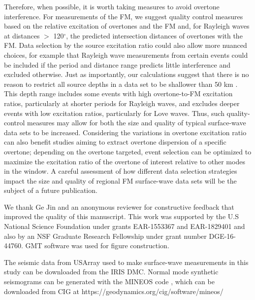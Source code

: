 \documentclass[extra,mreferee]{gji}
\begin{document}
Therefore, when possible, it is worth taking measures to avoid overtone interference. For measurements of the FM, we suggest quality control measures based on the relative excitation of overtones and the FM and, for Rayleigh waves at distances $>$ 120$^\circ$, the predicted intersection distances of overtones with the FM. Data selection by the source excitation ratio could also allow more nuanced choices, for example that Rayleigh wave measurements from certain events could be included if the period and distance range predicts little interference and excluded otherwise. Just as importantly, our calculations suggest that there is no reason to restrict all source depths in a data set to be shallower than 50 km  \citep[e.g.][]{jin2015crust,accardo2017surface,adams2018relationships,babikoff2019long}. This depth range includes some events with high overtone-to-FM excitation ratios, particularly at shorter periods for Rayleigh waves, and excludes deeper events with low excitation ratios, particularly for Love waves. Thus, such quality-control measures may allow for both the size and quality of typical surface-wave data sets to be increased. Considering the variations in overtone excitation ratio can also benefit studies aiming to extract overtone dispersion of a specific overtone; depending on the overtone targeted, event selection can be optimized to maximize the excitation ratio of the overtone of interest relative to other modes in the window.  A careful assessment of how different data selection strategies impact the size and quality of regional FM surface-wave data sets will be the subject of a future publication.  

\newpage 

\begin{acknowledgments}
We thank Ge Jin and an anonymous reviewer for constructive feedback that improved the quality of this manuscript. This work was supported by the U.S National Science Foundation under grants EAR-1553367 and EAR-1829401 and also by an NSF Graduate Research Fellowship under grant number DGE-16-44760. GMT software \citep{wessel1998new} was used for figure construction.
\end{acknowledgments}

\begin{dataavailability}
The seismic data from USArray used to make surface-wave measurements in this study can be downloaded from the IRIS DMC. Normal mode synthetic seismograms can be generated with the MINEOS code \citep{mineosbro}, which can be downloaded from CIG at https://geodynamics.org/cig/software/mineos/
\end{dataavailability}





\label{lastpage}
\end{document}
